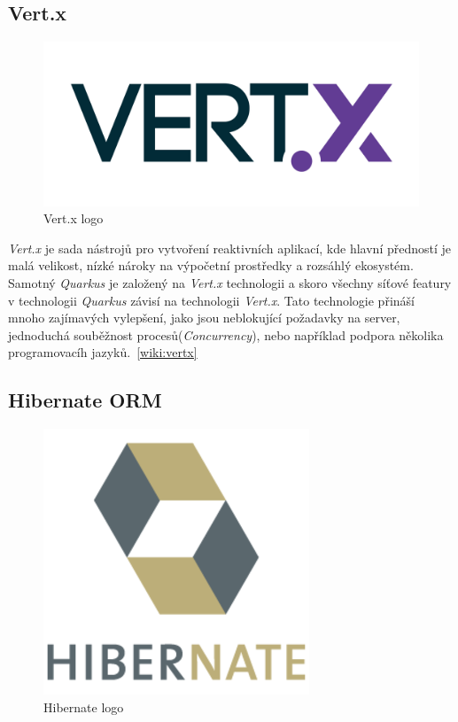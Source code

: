 \subsection{Vert.x}
\label{app_prostredi:vertx}
\begin{figure}[hbt]
  \centering
  \includegraphics[width=.30 \linewidth]{obrazky-figures/vertx.png}
  \caption{Vert.x logo}
\end{figure}
\emph{Vert.x} je sada nástrojů pro vytvoření reaktivních aplikací, kde hlavní předností je malá velikost, nízké nároky na výpočetní prostředky a rozsáhlý ekosystém.
Samotný \emph{Quarkus} je založený na \emph{Vert.x} technologii a skoro všechny síťové featury v technologii \emph{Quarkus} závisí na technologii \emph{Vert.x}.
Tato technologie přináší mnoho zajímavých vylepšení, jako jsou neblokující požadavky na server, jednoduchá souběžnost procesů(\emph{Concurrency}), nebo například podpora několika programovacíh jazyků.~\ref{wiki:vertx}

\newpage

\subsection{Hibernate ORM}
\label{app_prostredi:hibernate}
\begin{figure}[hbt]
  \centering
  \includegraphics[width=.2 \linewidth]{obrazky-figures/hibernate.png}
  \caption{Hibernate logo}
\end{figure}

